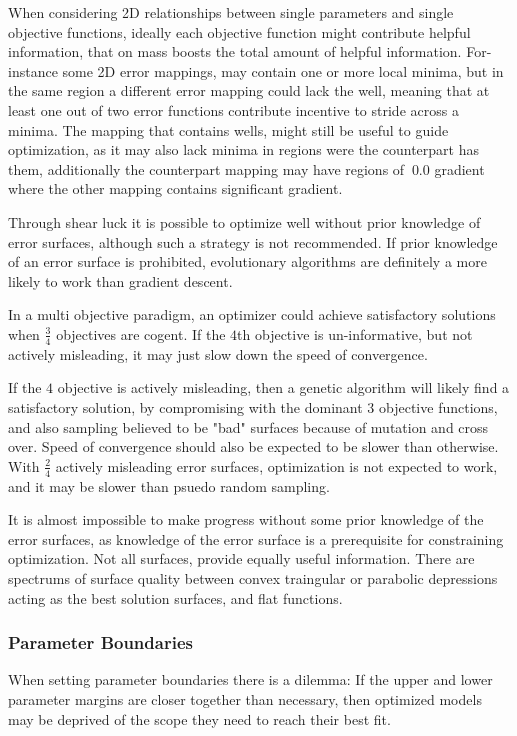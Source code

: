      
   When considering 2D relationships between single parameters and single objective functions, ideally each objective function might contribute helpful information, that on mass boosts the total amount of helpful information. For-instance some 2D error mappings, may contain one or more local minima, but in the same region a different error mapping could lack the well, meaning that at least one out of two error functions contribute incentive to stride across a minima. The mapping that contains wells, might still be useful to guide optimization, as it may also lack minima in regions were the counterpart has them, additionally the counterpart mapping may have regions of $~0.0$ gradient where the other mapping contains significant gradient.
   
   Through shear luck it is possible to optimize well without prior knowledge of error surfaces, although such a strategy is not recommended. If prior knowledge of an error surface is prohibited, evolutionary algorithms are definitely a more likely to work than gradient descent.
   
   In a multi objective paradigm, an optimizer could achieve satisfactory solutions when $\frac{3}{4}$ objectives are cogent. If the $4$th objective is un-informative, but not actively misleading, it may just slow down the speed of convergence.
   
   If the $4$ objective is actively misleading, then a genetic algorithm will likely find a satisfactory solution, by compromising with the dominant $3$ objective functions, and also sampling believed to be "bad" surfaces because of mutation and cross over. Speed of convergence should also be expected to be slower than otherwise. With $\frac{2}{4}$ actively misleading error surfaces, optimization is not expected to work, and it may be slower than psuedo random sampling.
   
   It is almost impossible to make progress without some prior knowledge of the error surfaces, as knowledge of the error surface is a prerequisite for constraining optimization. Not all surfaces, provide equally useful information. There are spectrums of surface quality between convex traingular or parabolic depressions acting as the best solution surfaces, and flat functions. 
   

\subsubsection{Parameter Boundaries}
When setting parameter boundaries there is a dilemma: If the upper and lower parameter margins are closer together than necessary, then optimized models may be deprived of the scope they need to reach their best fit. 

